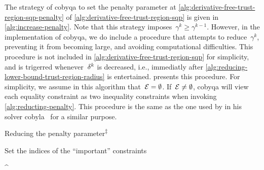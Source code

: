 The strategy of \gls{cobyqa} to set the penalty parameter at \cref{alg:derivative-free-trust-region-sqp-penalty} of \cref{alg:derivative-free-trust-region-sqp} is given in \cref{alg:increase-penalty}.
Note that this strategy imposes~$\gamma^k \ge \gamma^{k - 1}$.
However, in the implementation of \gls{cobyqa}, we do include a procedure that attempts to reduce~$\gamma^k$, preventing it from becoming large, and avoiding computational difficulties.
This procedure is not included in \cref{alg:derivative-free-trust-region-sqp} for simplicity, and is trigerred whenever~$\radlb[k]$ is decreased, i.e., immediatly after \cref{alg:reducing-lower-bound-trust-region-radius} is entertained.
 presents this procedure.
For simplicity, we assume in this algorithm that~$\mathcal{E} = \emptyset$.
If~$\mathcal{E} \neq \emptyset$, \gls{cobyqa} will view each equality constraint as two inequality constraints when invoking \cref{alg:reducting-penalty}.
This procedure is the same as the one used by \citeauthor{Powell_1994} in his solver \gls{cobyla}~\cite{Powell_1994} for a similar purpose.

\begin{algorithm}
    \caption[Reducing the penalty parameter]{Reducing the penalty parameter\textsuperscript{$\ddagger$}}
    \label{alg:reducting-penalty}
    \DontPrintSemicolon
    \onehalfspacing
    Set the indices of the \enquote{important} constraints
    \begin{algomathdisplay}
        \iub^{\ast} \eqdef {}
    \end{algomathdisplay}
\end{algorithm}
%

